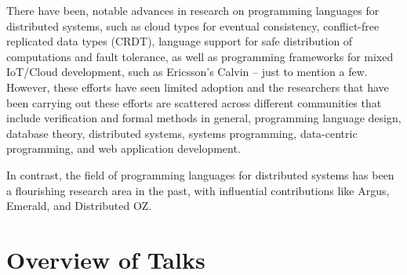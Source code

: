 \documentclass[a4paper]{article}
\begin{document}
There have been, notable advances in research on programming languages for distributed systems, such as cloud types for eventual consistency, conflict-free replicated data types (CRDT), language support for safe distribution of computations and fault tolerance, as well as programming frameworks for mixed IoT/Cloud development, such as Ericsson’s Calvin -- just to mention a few. However, these efforts have seen limited adoption and the researchers that have been carrying out these efforts are scattered across different communities that include verification and formal methods in general, programming language design, database theory, distributed systems, systems programming, data-centric programming, and web application development.

In contrast, the field of programming languages for distributed systems has been a flourishing research area in the past, with influential contributions like Argus, Emerald, and Distributed OZ.

\clearpage


\section*{Overview of Talks}













\end{document}
